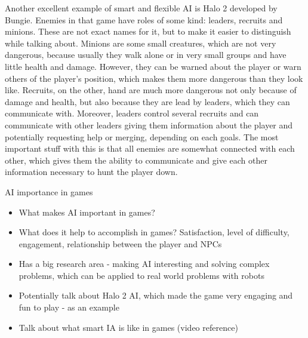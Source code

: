 \documentclass[journal]{IEEEtran}
\begin{document}
Another excellent example of smart and flexible AI is Halo 2 developed by Bungie. Enemies in that game have roles of some kind: leaders, recruits and minions. These are not exact names for it, but to make it easier to distinguish while talking about. Minions are some small creatures, which are not very dangerous, because usually they walk alone or in very small groups and have little health and damage. However, they can be warned about the player or warn others of the player's position, which makes them more dangerous than they look like. Recruits, on the other, hand are much more dangerous not only because of damage and health, but also because they are lead by leaders, which they can communicate with. Moreover, leaders control several recruits and can communicate with other leaders giving them information about the player and potentially requesting help or merging, depending on each goals. The most important stuff with this is that all enemies are somewhat connected with each other, which gives them the ability to communicate and give each other information necessary to hunt the player down.

AI importance in games
\begin{itemize}
	\item What makes AI important in games?
	\item What does it help to accomplish in games? Satisfaction, level of difficulty, engagement, relationship between the player and NPCs
	\item Has a big research area - making AI interesting and solving complex problems, which can be applied to real world problems with robots
	\item Potentially talk about Halo 2 AI, which made the game very engaging and fun to play - as an example
	\item Talk about what smart IA is like in games (video reference)
\end{itemize}
\end{document}

